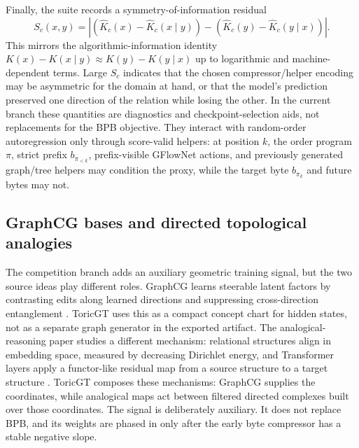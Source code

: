 \documentclass[11pt]{article}
\theoremstyle{definition}
\theoremstyle{plain}
\theoremstyle{remark}
\numberwithin{equation}{section}
\begin{document}
Finally, the suite records a symmetry-of-information residual
\begin{equation}
  S_c(x,y)
  =
  \left|(\widehat K_c(x)-\widehat K_c(x\mid y))
  -(\widehat K_c(y)-\widehat K_c(y\mid x))\right|.
\end{equation}
This mirrors the algorithmic-information identity $K(x)-K(x\mid y)\approx K(y)-K(y\mid x)$ up to logarithmic and machine-dependent terms.  Large $S_c$ indicates that the chosen compressor/helper encoding may be asymmetric for the domain at hand, or that the model's prediction preserved one direction of the relation while losing the other.  In the current branch these quantities are diagnostics and checkpoint-selection aids, not replacements for the BPB objective.  They interact with random-order autoregression only through score-valid helpers: at position $k$, the order program $\pi$, strict prefix $b_{\pi_{<k}}$, prefix-visible GFlowNet actions, and previously generated graph/tree helpers may condition the proxy, while the target byte $b_{\pi_k}$ and future bytes may not.

\subsection{GraphCG bases and directed topological analogies}

The competition branch adds an auxiliary geometric training signal, but the two source ideas play different roles.  GraphCG learns steerable latent factors by contrasting edits along learned directions and suppressing cross-direction entanglement \cite{liu2024graphcg}.  ToricGT uses this as a compact concept chart for hidden states, not as a separate graph generator in the exported artifact.  The analogical-reasoning paper studies a different mechanism: relational structures align in embedding space, measured by decreasing Dirichlet energy, and Transformer layers apply a functor-like residual map from a source structure to a target structure \cite{minegishi2026analogy}.  ToricGT composes these mechanisms: GraphCG supplies the coordinates, while analogical maps act between filtered directed complexes built over those coordinates.  The signal is deliberately auxiliary.  It does not replace BPB, and its weights are phased in only after the early byte compressor has a stable negative slope.
\end{document}
